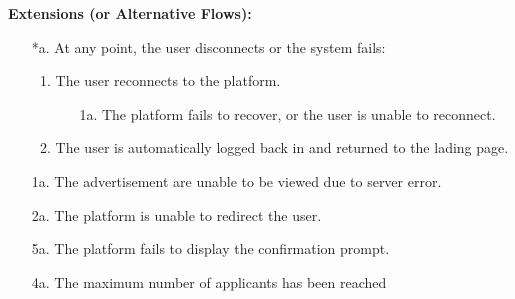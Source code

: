 \begin{itemize}[label={[\textbf{UC}]}, align=left, leftmargin=*]
    \textbf{Extensions (or Alternative Flows):} 
    \begin{enumerate}[label=\arabic*.]
        \item[*a.] At any point, the user disconnects or the system fails:
            \begin{enumerate}[label=\arabic*.]
                \item The user reconnects to the platform.
                    \begin{enumerate}[label=\alph*.]
                        \item[1a.] The platform fails to recover, or the user is unable to reconnect.
                    \end{enumerate}
                 \item The user is automatically logged back in and returned to the lading page.
            \end{enumerate}
        \item[1a.] The advertisement are unable to be viewed due to server error. 
        \item[2a.] The platform is unable to redirect the user.
        \item[5a.] The platform fails to display the confirmation prompt.
        \item[4a.] The maximum number of applicants has been reached
        \end{enumerate}
     

\end{itemize}
